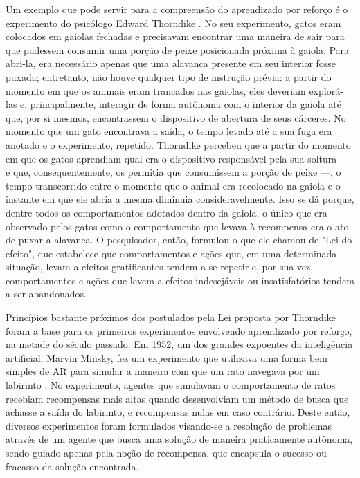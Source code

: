 \documentclass[cic,tc]{iiufrgs}
\begin{document}
Um exemplo que pode servir para a compreensão do aprendizado por reforço é o
experimento do psicólogo Edward Thorndike \cite{Thorndike1898}. No seu
experimento, gatos eram
colocados em gaiolas fechadas e precisavam encontrar uma maneira de sair para
que pudessem consumir uma porção de peixe posicionada próxima à gaiola. Para
abri-la, era necessário apenas que uma alavanca presente em seu interior fosse
puxada; entretanto, não houve qualquer tipo de instrução prévia: a partir do
momento em que os animais eram trancados nas gaiolas, eles deveriam explorá-las e,
principalmente, interagir de forma autônoma com o interior da gaiola até que,
por si mesmos, encontrassem o dispositivo de abertura de seus cárceres. No
momento que um gato encontrava a saída, o tempo levado até a sua fuga era
anotado e o experimento, repetido. Thorndike percebeu que a partir do momento em
que os
gatos aprendiam qual era o dispositivo responsável pela sua soltura
--- e que, consequentemente, os permitia que consumissem a porção de peixe ---,
o tempo transcorrido entre o momento que o animal era recolocado na gaiola e o
instante em que ele abria a mesma diminuia consideravelmente. Isso se dá porque,
dentre todos os comportamentos adotados dentro da gaiola, o único que era
observado pelos gatos como o comportamento que levava à recompensa era o ato de
puxar a alavanca. O pesquisador, então, formulou o que ele chamou de "Lei do
efeito", que estabelece que comportamentos e ações que, em uma determinada
situação, levam a efeitos gratificantes tendem a se repetir e, por sua vez,
comportamentos e ações que levem a efeitos indesejáveis ou insatisfatórios
tendem a ser abandonados.

Princípios bastante próximos dos postulados pela Lei proposta por Thorndike
foram a base para os primeiros experimentos envolvendo aprendizado por reforço,
na metade do século passado. Em 1952, um dos grandes expoentes da inteligência
artificial, Marvin Minsky, fez um experimento que utilizava uma forma bem
simples de AR para simular a maneira com que um rato navegava por um labirinto
\cite{Minsky1954}. No experimento, agentes que simulavam o comportamento de
ratos recebiam recompensas mais altas quando desenvolviam um método de busca que
achasse a saída do labirinto, e recompensas nulas em caso contrário. Deste
então, diversos experimentos foram formulados visando-se a resolução de
problemas através de um agente que busca uma solução de maneira praticamente
autônoma, sendo guiado apenas pela noção de recompensa, que encapsula o sucesso
ou fracasso da solução encontrada.
\end{document}

